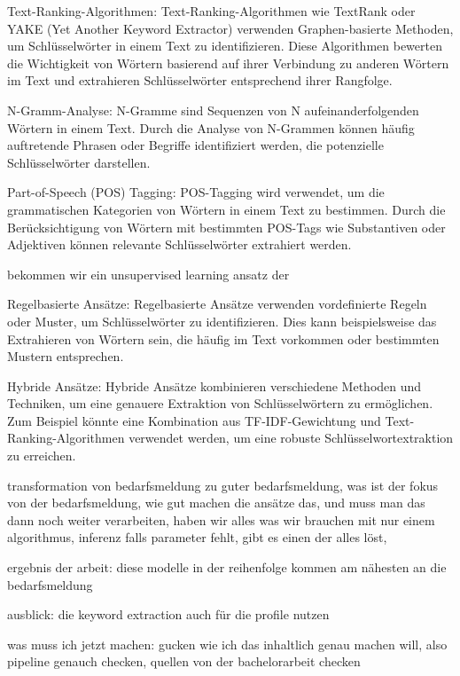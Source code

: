 \documentclass[a4paper,12pt]{scrreprt}
\begin{document}
Text-Ranking-Algorithmen: Text-Ranking-Algorithmen wie TextRank oder YAKE (Yet Another Keyword Extractor) verwenden Graphen-basierte Methoden, um Schlüsselwörter in einem Text zu identifizieren. Diese Algorithmen bewerten die Wichtigkeit von Wörtern basierend auf ihrer Verbindung zu anderen Wörtern im Text und extrahieren Schlüsselwörter entsprechend ihrer Rangfolge.
\cite{mihalcea2004textrank}
\cite{zhang2020empirical}
\cite{pay2019ensemble}

N-Gramm-Analyse: N-Gramme sind Sequenzen von N aufeinanderfolgenden Wörtern in einem Text. Durch die Analyse von N-Grammen können häufig auftretende Phrasen oder Begriffe identifiziert werden, die potenzielle Schlüsselwörter darstellen.
\cite{pirk2019implementierung}


Part-of-Speech (POS) Tagging: POS-Tagging wird verwendet, um die grammatischen Kategorien von Wörtern in einem Text zu bestimmen. Durch die Berücksichtigung von Wörtern mit bestimmten POS-Tags wie Substantiven oder Adjektiven können relevante Schlüsselwörter extrahiert werden.
\cite{kumawat2015pos}
\cite{nakagawa2007hybrid}

bekommen wir ein unsupervised learning ansatz der 

Regelbasierte Ansätze: Regelbasierte Ansätze verwenden vordefinierte Regeln oder Muster, um Schlüsselwörter zu identifizieren. Dies kann beispielsweise das Extrahieren von Wörtern sein, die häufig im Text vorkommen oder bestimmten Mustern entsprechen.

Hybride Ansätze: Hybride Ansätze kombinieren verschiedene Methoden und Techniken, um eine genauere Extraktion von Schlüsselwörtern zu ermöglichen. Zum Beispiel könnte eine Kombination aus TF-IDF-Gewichtung und Text-Ranking-Algorithmen verwendet werden, um eine robuste Schlüsselwortextraktion zu erreichen.


transformation von bedarfsmeldung zu guter bedarfsmeldung, was ist der fokus von der bedarfsmeldung, wie gut machen die ansätze das, und muss man das dann noch weiter verarbeiten, haben wir alles was wir brauchen mit nur einem algorithmus, inferenz falls parameter fehlt, gibt es einen der alles löst,

ergebnis der arbeit: diese modelle in der reihenfolge kommen am nähesten an die bedarfsmeldung

ausblick: die keyword extraction auch für die profile nutzen 

was muss ich jetzt machen: gucken wie ich das inhaltlich genau machen will, also pipeline genauch checken, quellen von der bachelorarbeit checken











%







%
%
\raggedright
\printbibliography
\end{document}
